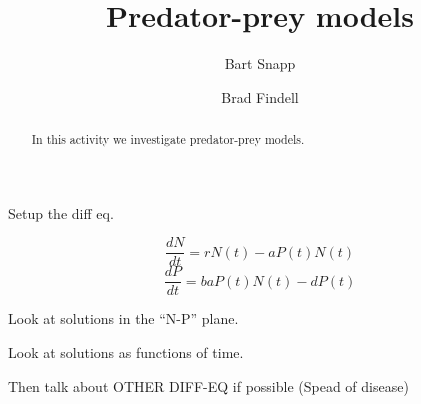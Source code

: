 \documentclass{ximera}
\title{Predator-prey models}
\author{Bart Snapp \and Brad Findell}
\begin{document}
\begin{abstract}
In this activity we investigate predator-prey models.
\end{abstract}
\maketitle


Setup the diff eq. 

\[
\frac{dN}{dt} = rN(t) -a P(t)N(t)
\]
\[
\frac{dP}{dt} = baP(t)N(t) -dP(t)
\]

Look at solutions in the ``N-P'' plane. 

Look at solutions as functions of time. 


Then talk about OTHER DIFF-EQ if possible 
(Spead of disease) 
\end{document}
